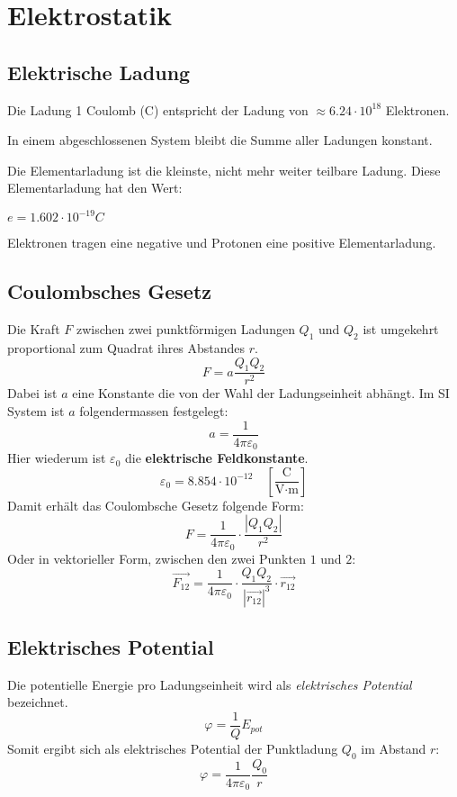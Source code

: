 \section{Elektrostatik}

\subsection{Elektrische Ladung}

Die Ladung 1 Coulomb (C) entspricht der Ladung von $\approx 6.24 \cdot 10^{18}$
Elektronen.

In einem abgeschlossenen System bleibt die Summe aller Ladungen konstant.

Die Elementarladung ist die kleinste, nicht mehr weiter teilbare Ladung. Diese Elementarladung hat
den Wert:

$e=1.602 \cdot 10^{-19} C$

Elektronen tragen eine negative und Protonen eine positive Elementarladung.

\subsection{Coulombsches Gesetz}

Die Kraft $F$ zwischen zwei punktförmigen Ladungen $Q_1$ und $Q_2$ ist umgekehrt
proportional zum Quadrat ihres Abstandes $r$.
\[
	F = a \frac{Q_1Q_2}{r^2}
\]
Dabei ist $a$ eine Konstante die von der Wahl der Ladungseinheit abhängt. Im SI
System ist $a$ folgendermassen festgelegt:
\[
	a = \frac{1}{4 \pi \varepsilon_0}
\]
Hier wiederum ist $\varepsilon_0$ die \textbf{elektrische Feldkonstante}.
\[
	\varepsilon_0 = 8.854 \cdot 10^{-12}
	\quad \left[ \frac{\textrm{C}}{\textrm{V}\cdot \textrm{m}} \right]
\]
Damit erhält das Coulombsche Gesetz folgende Form:
\[
	F = \frac{1}{4\pi\varepsilon_0} \cdot \frac{|Q_1Q_2|}{r^2}
\]
Oder in vektorieller Form, zwischen den zwei Punkten $1$ und $2$:
\[
	\vec{F_{12}} = \frac{1}{4\pi\varepsilon_0}
	\cdot \frac{Q_1Q_2}{|\vec{r_{12}}|^3}
	\cdot \vec{r_{12}}
\]

\subsection{Elektrisches Potential}

Die potentielle Energie pro Ladungseinheit wird als \textit{elektrisches
Potential} bezeichnet.
\[
	\varphi = \frac{1}{Q} E_{pot}
\]
Somit ergibt sich als elektrisches Potential der Punktladung $Q_0$ im Abstand $r$:
\[
	\varphi = \frac{1}{4\pi\varepsilon_0} \frac{Q_0}{r}
\]

